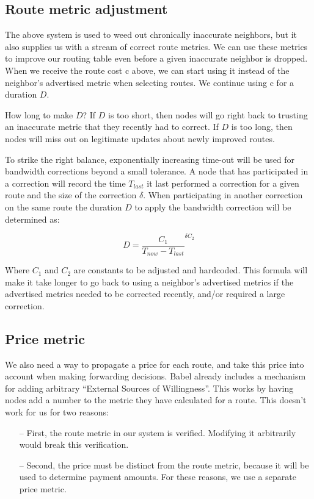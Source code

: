 \documentclass[11pt]{article}
\begin{document}
\subsection{Route metric adjustment}
\label{sec:adjustment}
The above system is used to weed out chronically inaccurate neighbors, but it also supplies us with a stream of correct route metrics. We can use these metrics to improve our routing table even before a given inaccurate neighbor is dropped. When we receive the route cost c above, we can start using it instead of the neighbor’s advertised metric when selecting routes. We continue using c for a duration $D$.
 
How long to make $D$? If $D$ is too short, then nodes will go right back to trusting an inaccurate metric that they recently had to correct. If $D$ is too long, then nodes will miss out on legitimate updates about newly improved routes.
					
To strike the right balance, exponentially increasing time-out will be used for bandwidth corrections beyond a small tolerance. A node that has participated in a correction will record the time $T_{last}$ it last performed a correction for a given route and the size of the correction $\delta$. When participating in another correction on the same route the duration $D$ to apply the bandwidth correction will be determined as:

\[
D = \frac{C_1}{T_{now} - T_{last}}^{\delta C_2}
\]

Where $C_1$ and $C_2$ are constants to be adjusted and hardcoded. This formula will make it take longer to go back to using a neighbor’s advertised metrics if the advertised metrics needed to be corrected recently, and/or required a large correction.

\subsection{Price metric}
We also need a way to propagate a price for each route, and take this price into account when making forwarding decisions. Babel already includes a mechanism for adding arbitrary ``External Sources of Willingness''. This works by having nodes add a number to the metric they have calculated for a route. This doesn’t work for us for two reasons: 

\begin{itemize}
\item[--] First, the route metric in our system is verified. Modifying it arbitrarily would break this verification.
\item[--] Second, the price must be distinct from the route metric, because it will be used to determine payment amounts. For these reasons, we use a separate price metric.
\end{itemize}
\end{document}
